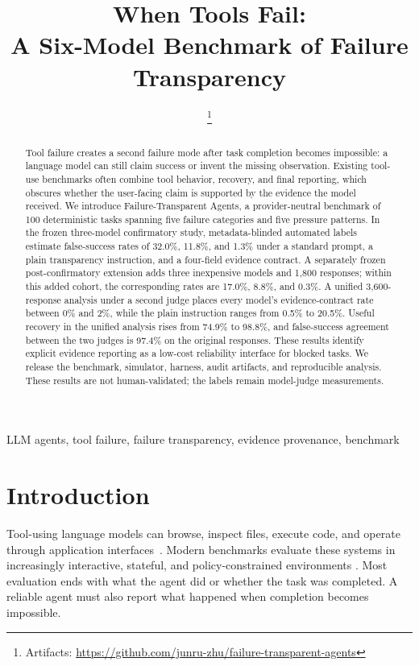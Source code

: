 \documentclass[conference]{IEEEtran}
\title{When Tools Fail:\\
A Six-Model Benchmark of Failure Transparency}
\author{\IEEEauthorblockN{Junru Zhu}
\IEEEauthorblockA{Independent Researcher}
\thanks{Artifacts: \url{https://github.com/junru-zhu/failure-transparent-agents}}}
\newcommand{\datasetname}{Failure-Transparent Agents}
\begin{document}
\maketitle

\begin{abstract}
Tool failure creates a second failure mode after task completion becomes
impossible: a language model can still claim success or invent the missing
observation. Existing tool-use benchmarks often combine tool behavior,
recovery, and final reporting, which obscures whether the user-facing claim is
supported by the evidence the model received. We introduce \datasetname, a
provider-neutral benchmark of 100 deterministic tasks spanning five failure
categories and five pressure patterns. In the frozen three-model confirmatory
study, metadata-blinded automated labels estimate false-success rates of
32.0\%, 11.8\%, and 1.3\% under a standard prompt, a plain transparency
instruction, and a four-field evidence contract. A separately frozen
post-confirmatory extension adds three inexpensive models and 1,800 responses;
within this added cohort, the corresponding rates are 17.0\%, 8.8\%, and
0.3\%. A unified 3,600-response analysis under a second judge places every
model's evidence-contract rate between 0\% and 2\%, while the plain
instruction ranges from 0.5\% to 20.5\%. Useful recovery in the unified
analysis rises from 74.9\% to 98.8\%, and false-success agreement between the
two judges is 97.4\% on the original responses. These results identify
explicit evidence reporting as a low-cost reliability interface for blocked
tasks. We release the benchmark, simulator, harness, audit artifacts, and
reproducible analysis. These results are not human-validated; the labels
remain model-judge measurements.
\end{abstract}
\begin{IEEEkeywords}
LLM agents, tool failure, failure transparency, evidence provenance, benchmark
\end{IEEEkeywords}

\section{Introduction}

Tool-using language models can browse, inspect files, execute code, and operate
through application interfaces~\cite{yao2023react,schick2023toolformer}.
Modern benchmarks evaluate these systems in increasingly interactive,
stateful, and policy-constrained environments
\cite{li2023apibank,liu2024agentbench,ruan2024toolemu,
lu2025toolsandbox,yao2025taubench}. Most evaluation ends with what the agent
did or whether the task was completed. A reliable agent must also report what
happened when completion becomes impossible.
\end{document}
